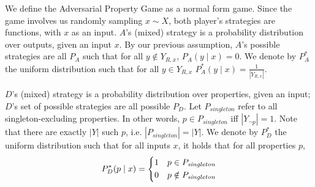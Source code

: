 We define the Adversarial Property Game as a normal form game.
Since the game involves us randomly sampling $x \sim X$, both player's strategies are functions, with $x$ as an input.
$A$'s (mixed) strategy is a probability distribution over outputs, given an input $x$. By our previous assumption, $A$'s possible strategies are all $P_A$ such that for all $y \not \in Y_{R, x}$, $P_A(y \mid x) = 0$. We denote by $P^*_A$ the uniform distribution such that for all $y \in Y_{R, x}$ $P^*_A(y \mid x) = \frac{1}{|Y_{R, x}|}$.


$D$'s (mixed) strategy is a probability distribution over properties, given an input; %
$D$'s set of possible strategies are all possible $P_D$.
Let $P_\mathit{singleton}$ refer to all singleton-excluding properties. In other words, $p \in P_\mathit{singleton}$ iff $|Y_{\neg p}| = 1$. Note that there are exactly $|Y|$ such $p$, i.e. $|P_\mathit{singleton}| = |Y|$.
We denote by $P^*_D$ the uniform distribution such that for all inputs $x$,
it holds that for all properties $p$,
\begin{equation} \label{eq:p*}
P^*_D(p \mid x) = 
    \begin{dcases}
        1 & p \in P_\mathit{singleton} \\
        0 & p \notin P_\mathit{singleton}     \\
    \end{dcases}
\end{equation}


